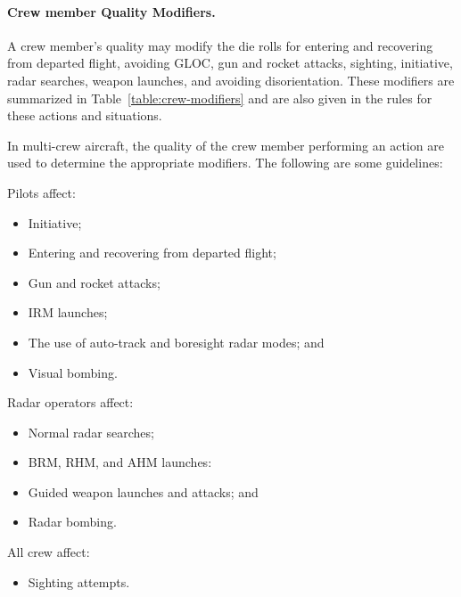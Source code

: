 \begin{advancedrules}
{

\paragraph{Crew member Quality Modifiers.} A crew member's quality may modify the die rolls for entering and recovering from departed flight, avoiding GLOC, gun and rocket attacks, sighting, initiative, radar searches, weapon launches, and avoiding disorientation. These modifiers are summarized in Table~\ref{table:crew-modifiers} and are also given in the rules for these actions and situations. 

In multi-crew aircraft, the quality of the crew member performing an action are used to determine the appropriate modifiers. The following are some guidelines:

Pilots affect:
\begin{itemize}
    \item Initiative;
    \item Entering and recovering from departed flight;
    \item Gun and rocket attacks;
    \item IRM launches;
    \item The use of auto-track and boresight radar modes; and
    \item Visual bombing.
\end{itemize}

Radar operators affect:
\begin{itemize}
    \item Normal radar searches;
    \item BRM, RHM, and AHM launches:
    \item Guided weapon launches and attacks; and
    \item Radar bombing.
\end{itemize}

All crew affect:
\begin{itemize}
    \item Sighting attempts.
\end{itemize}
}

\end{advancedrules}
